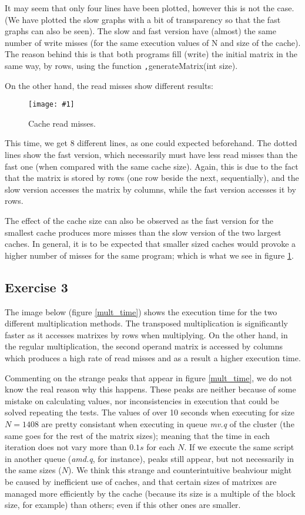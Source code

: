 \documentclass{article}
\newcommand{\myFigure}[4]{%
    \begin{figure}[!ht]
        \texttt{[image: \#1]}
        \centering
        \caption{#2}
        \label{#3}
    \end{figure}
}
\begin{document}
It may seem that only four lines have been plotted, however this is not the case. (We have plotted the slow graphs with a bit of transparency so that the fast graphs can also be seen). The slow and fast version have (almost) the same number of write misses (for the same execution values of N and size of the cache). The reason behind this is that both programs fill (write) the initial matrix in the same way, by rows, using the function \texttt,{generateMatrix(int size)}.

On the other hand, the read misses show different results:

\myFigure{../material_P3/out2/mv_att1/cache_lectura.png}{Cache read misses.}{cache_lectura}{0.55}

This time, we get 8 different lines, as one could expected beforehand. The dotted lines show the fast version, which necessarily must have less read misses than the fast one (when compared with the same cache size). Again, this is due to the fact that the matrix is stored by rows (one row beside the next, sequentially), and the slow version accesses the matrix by columns, while the fast version accesses it by rows.

The effect of the cache size can also be observed as the fast version for the smallest cache produces more misses than the slow version of the two largest caches. In general, it is to be expected that smaller sized caches would provoke a higher number of misses for the same program; which is what we see in figure \ref{cache_lectura}.



\subsection*{Exercise 3}

The image below (figure \ref{mult_time}) shows the execution time for the two different multiplication methods. The transposed multiplication is significantly faster as it accesses matrixes by rows when multiplying. On the other hand, in the regular multiplication, the second operand matrix is accessed by columns which produces a high rate of read misses and as a result a higher execution time.

Commenting on the strange peaks that appear in figure \ref{mult_time}, we do not know the real reason why this happens. These peaks are neither because of some mistake on calculating values, nor inconsistencies in execution that could be solved repeating the tests. The values of over 10 seconds when executing for size $N=1408$ are pretty consistant when executing in queue \emph{mv.q} of the cluster (the same goes for the rest of the matrix sizes); meaning that the time in each iteration does not vary more than $0.1s$ for each $N$. If we execute the same script in another queue (\emph{amd.q}, for instance), peaks still appear, but not necessarily in the same sizes ($N$). We think this strange and counterintuitive beahviour might be caused by inefficient use of caches, and that certain sizes of matrixes are managed more efficiently by the cache (because its size is a multiple of the block size, for example) than others; even if this other ones are smaller.
\end{document}
